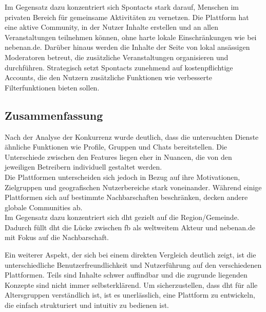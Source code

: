 Im Gegensatz dazu konzentriert sich Spontacts stark darauf, Menschen im privaten Bereich für gemeinsame Aktivitäten zu vernetzen. Die Plattform hat eine aktive Community, in der Nutzer Inhalte erstellen und an allen Veranstaltungen teilnehmen können, ohne harte lokale Einschränkungen wie bei nebenan.de. Darüber hinaus werden die Inhalte der Seite von lokal ansässigen Moderatoren betreut, die zusätzliche Veranstaltungen organisieren und durchführen. Strategisch setzt Spontacts zunehmend auf kostenpflichtige Accounts, die den Nutzern zusätzliche Funktionen wie verbesserte Filterfunktionen bieten sollen.

\subsection{Zusammenfassung}

Nach der Analyse der Konkurrenz wurde deutlich, dass die untersuchten Dienste ähnliche Funktionen wie Profile, Gruppen und Chats bereitstellen. Die Unterschiede zwischen den Features liegen eher in Nuancen, die von den jeweiligen Betreibern individuell gestaltet werden. \\
Die Plattformen unterscheiden sich jedoch in Bezug auf ihre Motivationen, Zielgruppen und geografischen Nutzerbereiche stark voneinander. Während einige Plattformen sich auf bestimmte Nachbarschaften beschränken, decken andere globale Communities ab. \\
Im Gegensatz dazu konzentriert sich \acrshort{dht} gezielt auf die Region/Gemeinde. Dadurch füllt \acrshort{dht} die Lücke zwischen \acrshort{fb} als weltweitem Akteur und nebenan.de mit Fokus auf die Nachbarschaft.


Ein weiterer Aspekt, der sich bei einem direkten Vergleich deutlich zeigt, ist die unterschiedliche Benutzerfreundlichkeit und Nutzerführung auf den verschiedenen Plattformen. Teils sind Inhalte schwer auffindbar und die zugrunde liegenden Konzepte sind nicht immer selbsterklärend. Um sicherzustellen, dass \acrshort{dht} für alle Altersgruppen verständlich ist, ist es unerlässlich, eine Plattform zu entwickeln, die einfach strukturiert und intuitiv zu bedienen ist.

